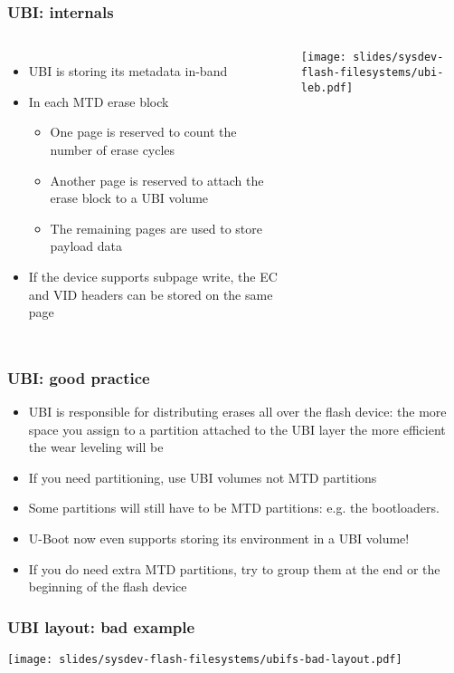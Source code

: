 \begin{frame}
  \frametitle{UBI: internals}
  \begin{columns}
    \begin{itemize}
    \item UBI is storing its metadata in-band
    \item In each MTD erase block
    \begin{itemize}
      \item One page is reserved to count the number of erase cycles
      \item Another page is reserved to attach the erase block to a
        UBI volume
      \item The remaining pages are used to store payload data
      \end{itemize}
    \item If the device supports subpage write, the EC and VID headers
      can be stored on the same page
    \end{itemize}
    \texttt{[image: slides/sysdev-flash-filesystems/ubi-leb.pdf]}
  \end{columns}
\end{frame}

\begin{frame}
  \frametitle{UBI: good practice}
  \begin{itemize}
  \item UBI is responsible for distributing erases all over the flash
    device: the more space you assign to a partition attached to the
    UBI layer the more efficient the wear leveling will be
  \item If you need partitioning, use UBI volumes not MTD partitions
  \item Some partitions will still have to be MTD partitions: e.g. the
    bootloaders.
  \item U-Boot now even supports storing its environment in a UBI volume!
  \item If you do need extra MTD partitions, try to group them at the end
    or the beginning of the flash device
  \end{itemize}
\end{frame}

\begin{frame}
  \frametitle{UBI layout: bad example}
  \begin{center}
    \texttt{[image: slides/sysdev-flash-filesystems/ubifs-bad-layout.pdf]}
  \end{center}
\end{frame}

